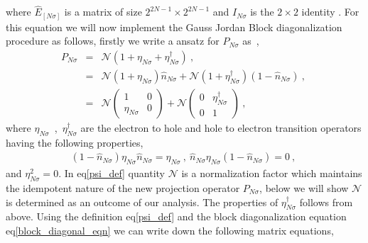 \documentclass[12pt,a4paper]{article}
\begin{document}
where $\hat{E}_{[N\sigma]}$ is a matrix of size $2^{2N-1}\times 2^{2N-1}$ and $I_{N\sigma}$ is the $2\times 2$ identity . For this equation we will now implement the Gauss Jordan Block diagonalization procedure as follows, firstly we write a ansatz for $P_{N\sigma}$ as~, 
\begin{eqnarray}
P_{N\sigma} &=& \mathcal{N}(1+\eta_{N\sigma}+\eta^{\dagger}_{N\sigma})~,\nonumber\\
&=&\mathcal{N}(1+\eta_{N\sigma})\hat{n}_{N\sigma}+\mathcal{N}(1+\eta^{\dagger}_{N\sigma})(1-\hat{n}_{N\sigma})~,~\nonumber\\
&=&\mathcal{N}\begin{pmatrix}
1 & 0\\
\eta_{N\sigma} & 0
\end{pmatrix}+\mathcal{N}\begin{pmatrix}
0 & \eta^{\dagger}_{N\sigma}\\
0 & 1
\end{pmatrix}~,\label{psi_def}
\end{eqnarray}
where $\eta_{N\sigma}$~,~$\eta^{\dagger}_{N\sigma}$ are the electron to hole and hole to electron transition operators having the following properties,
\begin{eqnarray}
(1-\hat{n}_{N\sigma})\eta_{N\sigma}\hat{n}_{N\sigma}=\eta_{N\sigma}~,~\hat{n}_{N\sigma}\eta_{N\sigma}(1-\hat{n}_{N\sigma})=0~,~\nonumber
\end{eqnarray}
and $\eta^{2}_{N\sigma}=0$. In eq\eqref{psi_def} quantity $\mathcal{N}$ is a normalization factor which maintains the idempotent nature of the new projection operator $P_{N\sigma}$, below we will show $\mathcal{N}$ is determined as an outcome of our analysis.
The properties of $\eta^{\dagger}_{N\sigma}$ follows from above.
Using the definition eq\eqref{psi_def} and the block diagonalization equation eq\eqref{block_diagonal_eqn} we can write down the following matrix equations,
\end{document}
